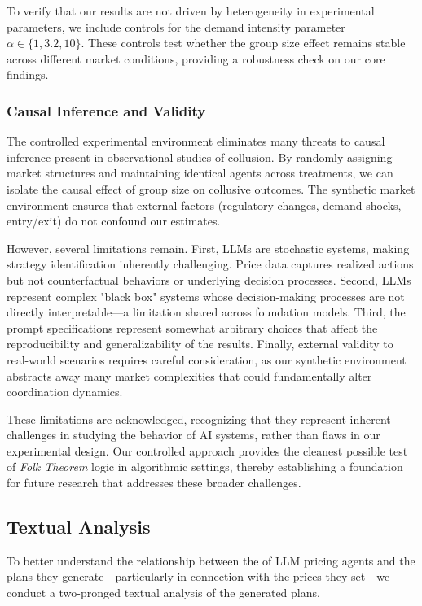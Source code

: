 To verify that our results are not driven by heterogeneity in experimental parameters, we include controls for the demand intensity parameter $\alpha \in \{1, 3.2, 10\}$. These controls test whether the group size effect remains stable across different market conditions, providing a robustness check on our core findings.

\subsubsection*{Causal Inference and Validity}

The controlled experimental environment eliminates many threats to causal inference present in observational studies of collusion. By randomly assigning market structures and maintaining identical agents across treatments, we can isolate the causal effect of group size on collusive outcomes. The synthetic market environment ensures that external factors (regulatory changes, demand shocks, entry/exit) do not confound our estimates.

However, several limitations remain. First, LLMs are stochastic systems, making strategy identification inherently challenging. Price data captures realized actions but not counterfactual behaviors or underlying decision processes. Second, LLMs represent complex "black box" systems whose decision-making processes are not directly interpretable—a limitation shared across foundation models. Third, the prompt specifications represent somewhat arbitrary choices that affect the reproducibility and generalizability of the results. Finally, external validity to real-world scenarios requires careful consideration, as our synthetic environment abstracts away many market complexities that could fundamentally alter coordination dynamics.

These limitations are acknowledged, recognizing that they represent inherent challenges in studying the behavior of AI systems, rather than flaws in our experimental design. Our controlled approach provides the cleanest possible test of \emph{Folk Theorem} logic in algorithmic settings, thereby establishing a foundation for future research that addresses these broader challenges.

\subsection{Textual Analysis}

To better understand the relationship between the  of LLM pricing agents and the plans they generate---particularly in connection with the prices they set---we conduct a two-pronged textual analysis of the generated plans.

